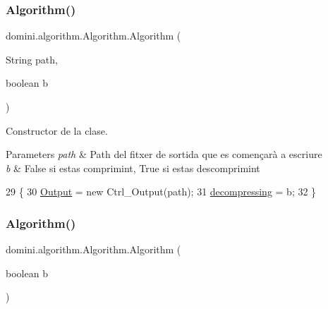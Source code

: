 \subsubsection{\texorpdfstring{Algorithm()}{Algorithm()}\hspace{0.1cm}{\footnotesize\ttfamily [1/3]}}
{\footnotesize\ttfamily domini.\+algorithm.\+Algorithm.\+Algorithm (\begin{DoxyParamCaption}\item[{String}]{path,  }\item[{boolean}]{b }\end{DoxyParamCaption})\hspace{0.3cm}{\ttfamily [inline]}}



Constructor de la clase. 


\begin{DoxyParams}{Parameters}
{\em path} & Path del fitxer de sortida que es començarà a escriure \\
\hline
{\em b} & False si estas comprimint, True si estas descomprimint \\
\hline
\end{DoxyParams}

\begin{DoxyCode}
29                                              \{
30         \hyperlink{classdomini_1_1algorithm_1_1Algorithm_a4de9955411c656325adc391ef570c082}{Output} = \textcolor{keyword}{new} Ctrl\_Output(path);
31         \hyperlink{classdomini_1_1algorithm_1_1Algorithm_a0ec73147fb68a16e53801ea5da35b089}{decompressing} = b;
32     \}
\end{DoxyCode}
\mbox{\label{classdomini_1_1algorithm_1_1Algorithm_a53e4ed336c98702ebc2a44a5fdb5f4b5}} 
\subsubsection{\texorpdfstring{Algorithm()}{Algorithm()}\hspace{0.1cm}{\footnotesize\ttfamily [2/3]}}
{\footnotesize\ttfamily domini.\+algorithm.\+Algorithm.\+Algorithm (\begin{DoxyParamCaption}\item[{boolean}]{b }\end{DoxyParamCaption})\hspace{0.3cm}{\ttfamily [inline]}}




